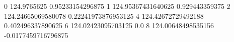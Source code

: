 0 124.9765625 0.95233154296875
1 124.95367431640625 0.929443359375
2 124.24665069580078 0.22241973876953125
4 124.42672729492188 0.402496337890625
6 124.02423095703125 0.0
8 124.00648498535156 -0.0177459716796875
